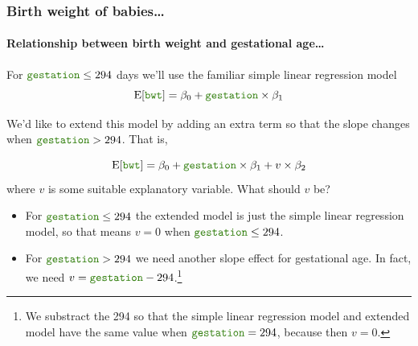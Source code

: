 \documentclass{beamer}\usepackage[]{graphicx}\usepackage[]{xcolor}
\begin{document}
\begin{frame}[fragile]
\frametitle{Birth weight of babies\ldots}
\framesubtitle{Relationship between birth weight and gestational age\ldots}
For $\rcode{gestation} \le 294$ days we'll use the familiar simple linear regression model
\[
\E[\rcode{bwt}]=\beta_0 + \rcode{gestation} \times \beta_1
\]
\vspace{-1ex}

We'd like to extend this model by adding an extra term so that the slope changes when $\rcode{gestation}>294$. That is,

\[
\E[\rcode{bwt}]=\beta_0 + \rcode{gestation} \times \beta_1 + v \times \beta_2
\]
where $v$ is some suitable explanatory variable. What should $v$ be? 
\medskip

\begin{itemize}
\item For $\rcode{gestation} \le 294$ the extended model is just the simple linear regression model, so that means $v=0$ when $\rcode{gestation} \le 294$.
\item For $\rcode{gestation} > 294$ we need another slope effect for gestational age. In fact, we need $v = \rcode{gestation} - 294$.\footnote{We substract the 294 so that the simple linear regression model and extended model have the same value when $\rcode{gestation} = 294$, because then $v=0$.}
\end{itemize}

\end{frame}
\end{document}

